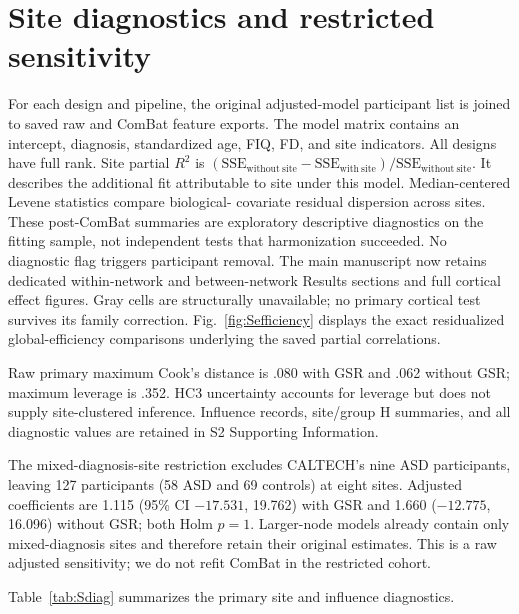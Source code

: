 \documentclass[10pt,letterpaper]{article}
\begin{document}
\section*{Site diagnostics and restricted sensitivity}
For each design and pipeline, the original adjusted-model participant list is
joined to saved raw and ComBat feature exports. The model matrix contains an
intercept, diagnosis, standardized age, FIQ, FD, and site indicators. All designs
have full rank. Site partial $R^2$ is
$(\mathrm{SSE}_{\mathrm{without\ site}}-\mathrm{SSE}_{\mathrm{with\ site}})/
\mathrm{SSE}_{\mathrm{without\ site}}$. It describes the additional fit attributable
to site under this model. Median-centered Levene statistics compare biological-
covariate residual dispersion across sites. These post-ComBat summaries are
exploratory descriptive diagnostics on the fitting sample, not independent tests
that harmonization succeeded. No diagnostic flag triggers participant removal.
The main manuscript now retains dedicated within-network and between-network
Results sections and full cortical effect figures. Gray cells are structurally
unavailable; no primary cortical test survives its family correction.
Fig.~\ref{fig:Sefficiency} displays the exact residualized global-efficiency
comparisons underlying the saved partial correlations.

Raw primary maximum Cook's distance is .080 with GSR and .062 without GSR;
maximum leverage is .352. HC3 uncertainty accounts for leverage but does not
supply site-clustered inference. Influence records, site/group H summaries, and
all diagnostic values are retained in S2 Supporting Information.

The mixed-diagnosis-site restriction excludes CALTECH's nine ASD participants,
leaving 127 participants (58 ASD and 69 controls) at eight sites. Adjusted
coefficients are 1.115 (95\% CI $-17.531$, 19.762) with GSR and 1.660
($-12.775$, 16.096) without GSR; both Holm $p=1$. Larger-node models already
contain only mixed-diagnosis sites and therefore retain their original estimates.
This is a raw adjusted sensitivity; we do not refit ComBat in the restricted cohort.

Table~\ref{tab:Sdiag} summarizes the primary site and influence diagnostics.

\end{document}
